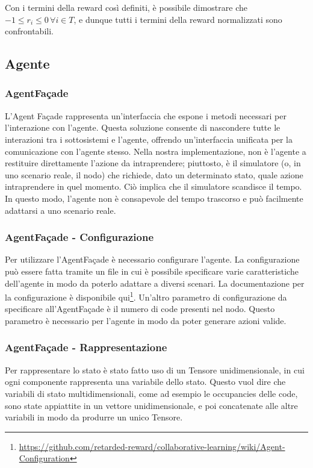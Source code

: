 \documentclass[conference]{IEEEtran}
\begin{document}
Con i termini della reward così definiti, è possibile dimostrare che $ -1 \leq r_i \leq 0 \, \forall i \in T$, e dunque tutti i termini della reward normalizzati sono 
confrontabili.

\subsection{Agente}

\subsubsection{AgentFaçade}
L'Agent Façade rappresenta un'interfaccia che espone i metodi necessari per l'interazione con l'agente. Questa soluzione consente di nascondere tutte le interazioni tra i sottosistemi e l'agente, offrendo un'interfaccia unificata per la comunicazione con l'agente stesso. Nella nostra implementazione, non è l'agente a restituire direttamente l'azione da intraprendere; piuttosto, è il simulatore (o, in uno scenario reale, il nodo) che richiede, dato un determinato stato, quale azione intraprendere in quel momento. Ciò implica che il simulatore scandisce il tempo. In questo modo, l'agente non è consapevole del tempo trascorso e può facilmente adattarsi a uno scenario reale.
\subsubsection{AgentFaçade - Configurazione} 
Per utilizzare l'AgentFaçade è necessario configurare l'agente. La configurazione può essere fatta tramite un file in cui è possibile specificare varie caratteristiche dell'agente in modo da poterlo adattare a diversi scenari. La documentazione per la configurazione è disponibile qui\footnote{\href{https://github.com/retarded-reward/collaborative-learning/wiki/Agent-Configuration}{https://github.com/retarded-reward/collaborative-learning/wiki/Agent-Configuration}}. Un'altro parametro di configurazione da specificare all'AgentFaçade è il numero di code presenti nel nodo. Questo parametro è necessario per l'agente in modo da poter generare azioni valide.
\subsubsection{AgentFaçade - Rappresentazione}
Per rappresentare lo stato è stato fatto uso di un Tensore unidimensionale, in cui
ogni componente rappresenta una variabile dello stato. Questo vuol dire che variabili
di stato multidimensionali, come ad esempio le occupancies delle code, sono state
appiattite in un vettore unidimensionale, e poi concatenate alle altre variabili in modo
da produrre un unico Tensore.
\end{document}
